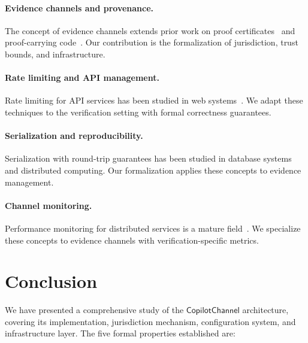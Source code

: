 \documentclass[11pt]{article}
\newcommand{\CopChan}{\mathsf{CopilotChannel}}
\begin{document}
\paragraph{Evidence channels and provenance.}
The concept of evidence channels extends prior work on proof
certificates~\cite{necula1997proof} and proof-carrying
code~\cite{appel2001foundational}.  Our contribution is the
formalization of jurisdiction, trust bounds, and infrastructure.

\paragraph{Rate limiting and API management.}
Rate limiting for API services has been studied in web
systems~\cite{nayak2024rate}.  We adapt these techniques to
the verification setting with formal correctness guarantees.

\paragraph{Serialization and reproducibility.}
Serialization with round-trip guarantees has been studied in
database systems~\cite{stonebraker1986design} and distributed
computing.  Our formalization applies these concepts to
evidence management.

\paragraph{Channel monitoring.}
Performance monitoring for distributed services is a mature
field~\cite{barham2004using}.  We specialize these concepts
to evidence channels with verification-specific metrics.

\section{Conclusion}
\label{sec:conclusion}

We have presented a comprehensive study of the $\CopChan$
architecture, covering its implementation, jurisdiction mechanism,
configuration system, and infrastructure layer.  The five formal
properties established are:
\end{document}
